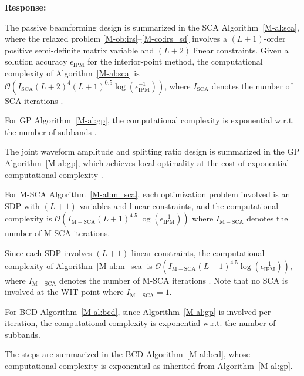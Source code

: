 \documentclass{article}
\newcounter{reviewer}
\newcounter{point}[reviewer]
\newcounter{response}[reviewer]
\newenvironment{response}
	{\refstepcounter{response} \medskip \noindent \textbf{Response:}\ }
	{\medskip}
\begin{document}
\begin{reviewer}
\begin{response}
			\begin{framed}
				The passive beamforming design is summarized in the SCA Algorithm~\ref{M-al:sca}, where the relaxed problem \eqref{M-ob:irs}--\eqref{M-co:irs_sd} involves a $(L+1)$-order positive semi-definite matrix variable and $(L+2)$ linear constraints. Given a solution accuracy $\epsilon_{\mathrm{IPM}}$ for the interior-point method, the computational complexity of Algorithm~\ref{M-al:sca} is $\mathcal{O}\left(I_{\mathrm{SCA}}(L+2)^4 (L+1)^{0.5} \log(\epsilon_{\mathrm{IPM}}^{-1})\right)$, where $I_{\mathrm{SCA}}$ denotes the number of SCA iterations \cite{M-Luo2010}.
			\end{framed}

			For GP Algorithm~\ref{M-al:gp}, the computational complexity is exponential w.r.t. the number of subbands \cite{M-Chiang2005}.
			\begin{framed}
				The joint waveform amplitude and splitting ratio design is summarized in the GP Algorithm~\ref{M-al:gp}, which achieves local optimality at the cost of exponential computational complexity \cite{M-Chiang2005}.
			\end{framed}

			For M-SCA Algorithm~\ref{M-al:m_sca}, each optimization problem involved is an SDP with $(L+1)$ variables and linear constraints, and the computational complexity is $\mathcal{O}\left(I_{\mathrm{M-SCA}}(L+1)^{4.5} \log(\epsilon_{\mathrm{IPM}}^{-1})\right)$ where $I_{\mathrm{M-SCA}}$ denotes the number of M-SCA iterations.
			\begin{framed}
				Since each SDP involves $(L+1)$ linear constraints, the computational complexity of Algorithm~\ref{M-al:m_sca} is $\mathcal{O}\left(I_{\mathrm{M-SCA}}(L+1)^{4.5} \log(\epsilon_{\mathrm{IPM}}^{-1})\right)$, where $I_{\mathrm{M-SCA}}$ denotes the number of M-SCA iterations \cite{M-Luo2010}. Note that no SCA is involved at the WIT point where $I_{\mathrm{M-SCA}}=1$.
			\end{framed}

			For BCD Algorithm~\ref{M-al:bcd}, since Algorithm~\ref{M-al:gp} is involved per iteration, the computational complexity is exponential w.r.t. the number of subbands.
			\begin{framed}
				The steps are summarized in the BCD Algorithm~\ref{M-al:bcd}, whose computational complexity is exponential as inherited from Algorithm~\ref{M-al:gp}.
			\end{framed}


\end{response}
\end{reviewer}
\end{document}
